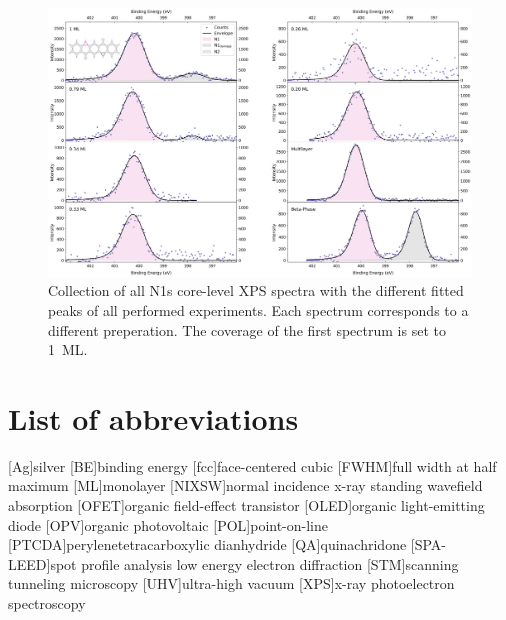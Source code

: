 \begin{figure}[H]
	\centering
	\includegraphics[height=0.9\textwidth,  angle=90]{images/N1s-all.png}
	\caption{Collection of all N1s core-level \ac{XPS} spectra with the different fitted peaks of all performed experiments. Each spectrum corresponds to a different preperation. The coverage of the first spectrum is set to 1~\ac{ML}.}
	\label{fig:N1s-stacked}
\end{figure}


\newpage
\section*{List of abbreviations}

\begin{acronym}
    [Ag]{silver}
    [BE]{binding energy}
    [fcc]{face-centered cubic}
    [FWHM]{full width at half maximum}
    [ML]{monolayer}
    [NIXSW]{normal incidence x-ray standing wavefield absorption}
    [OFET]{organic field-effect transistor}
    [OLED]{organic light-emitting diode}
    [OPV]{organic photovoltaic}
    [POL]{point-on-line}
    [PTCDA]{perylenetetracarboxylic dianhydride}
    [QA]{quinachridone}
    [SPA-LEED]{spot profile analysis low energy electron diffraction}
    [STM]{scanning tunneling microscopy}
    [UHV]{ultra-high vacuum}
    [XPS]{x-ray photoelectron spectroscopy}
\end{acronym}




